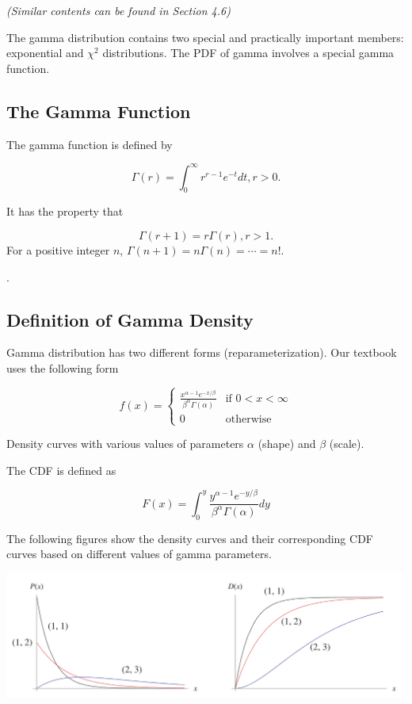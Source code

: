 \documentclass[
]{book}
\begin{document}
\emph{(Similar contents can be found in Section 4.6)}

\hfill\break

The gamma distribution contains two special and practically important members: exponential and \(\chi^2\) distributions. The PDF of gamma involves a special gamma function.

\hypertarget{the-gamma-function}{%
\subsection{The Gamma Function}\label{the-gamma-function}}

The gamma function is defined by

\[
\Gamma(r) = \int_0^\infty r^{r-1}e^{-t}dt, r > 0.
\]

It has the property that

\[
\Gamma(r+1) = r\Gamma(r), r > 1.
\]
For a positive integer \(n\), \(\Gamma(n+1) = n\Gamma(n) = \cdots = n!\).

.

\hypertarget{definition-of-gamma-density}{%
\subsection{Definition of Gamma Density}\label{definition-of-gamma-density}}

Gamma distribution has two different forms (reparameterization). Our textbook uses the following form

\[
\displaystyle f(x) = \begin{cases} 
 \frac{x^{\alpha-1}e^{-x/\beta}}{\beta^\alpha\Gamma(\alpha)} & \text{if $0 < x < \infty$} \\  
 0 & \text{otherwise}  
 \end{cases}
\]

Density curves with various values of parameters \(\alpha\) (shape) and \(\beta\) (scale).

The CDF is defined as

\[
F(x) = \int_0^y \frac{y^{\alpha-1}e^{-y/\beta}}{\beta^\alpha\Gamma(\alpha)} dy
\]

The following figures show the density curves and their corresponding CDF curves based on different values of gamma parameters.

\begin{center}\includegraphics[width=0.7\linewidth]{topic03/gammaCDF-PDF} \end{center}
\end{document}

